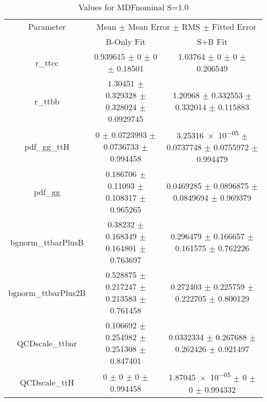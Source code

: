\begin{table}
\centering
\caption{Values for MDFnominal S=1.0}
\begin{tabular}{ccc}
\toprule
Parameter & \multicolumn{2}{c}{Mean $\pm$ Mean Error $\pm$ RMS $\pm$ Fitted Error}\\
 & B-Only Fit & S+B Fit\\
\midrule
r\_ttcc & \num{0.939615} $\pm$ \num{0} $\pm$ \num{0} $\pm$ \num{0.18501} & \num{1.03764} $\pm$ \num{0} $\pm$ \num{0} $\pm$ \num{0.206549}\\
r\_ttbb & \num{1.30451} $\pm$ \num{0.329328} $\pm$ \num{0.328024} $\pm$ \num{0.0929745} & \num{1.20968} $\pm$ \num{0.332553} $\pm$ \num{0.332014} $\pm$ \num{0.115883}\\
pdf\_gg\_ttH & \num{0} $\pm$ \num{0.0723993} $\pm$ \num{0.0736733} $\pm$ \num{0.994458} & \num{3.25316e-05} $\pm$ \num{0.0737748} $\pm$ \num{0.0755972} $\pm$ \num{0.994479}\\
pdf\_gg & \num{0.186706} $\pm$ \num{0.11093} $\pm$ \num{0.108317} $\pm$ \num{0.965265} & \num{0.0469285} $\pm$ \num{0.0896875} $\pm$ \num{0.0849694} $\pm$ \num{0.969379}\\
bgnorm\_ttbarPlusB & \num{0.38232} $\pm$ \num{0.168349} $\pm$ \num{0.164801} $\pm$ \num{0.763697} & \num{0.296479} $\pm$ \num{0.166657} $\pm$ \num{0.161575} $\pm$ \num{0.762226}\\
bgnorm\_ttbarPlus2B & \num{0.528875} $\pm$ \num{0.217247} $\pm$ \num{0.213583} $\pm$ \num{0.761458} & \num{0.272403} $\pm$ \num{0.225759} $\pm$ \num{0.222705} $\pm$ \num{0.800129}\\
QCDscale\_ttbar & \num{0.106692} $\pm$ \num{0.254982} $\pm$ \num{0.251308} $\pm$ \num{0.847401} & \num{0.0332334} $\pm$ \num{0.267688} $\pm$ \num{0.262426} $\pm$ \num{0.921497}\\
QCDscale\_ttH & \num{0} $\pm$ \num{0} $\pm$ \num{0} $\pm$ \num{0.994458} & \num{1.87045e-05} $\pm$ \num{0} $\pm$ \num{0} $\pm$ \num{0.994332}\\
\bottomrule
\end{tabular}
\end{table}